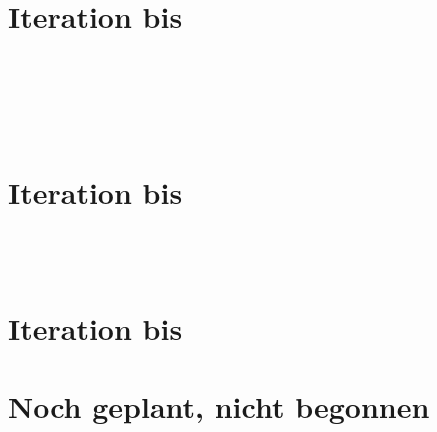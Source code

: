	\section{Iteration bis } %
	\\
	\\
	\\
	
	\\

	\section{Iteration bis } %
	\\
	\\



	\section{Iteration bis } %



\section*{Noch geplant, nicht begonnen}

	\\

